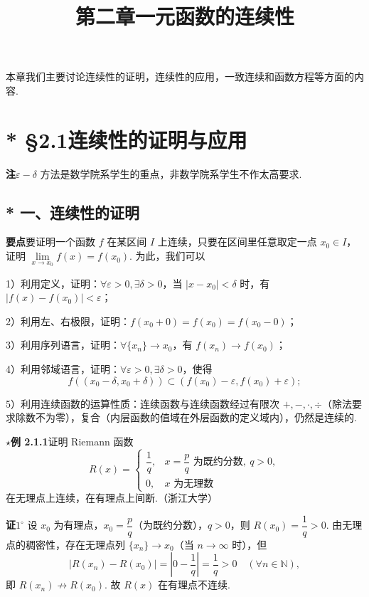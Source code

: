 \documentclass[UTF8,12pt,a4paper,fontset=fandol]{ctexart}
\title{第二章\quad 一元函数的连续性}
\author{}
\date{}
\begin{document}
\maketitle

本章我们主要讨论连续性的证明，连续性的应用，一致连续和函数方程等方面的内容.

\section*{* §2.1\quad 连续性的证明与应用}

\noindent\textbf{注}\quad $\varepsilon-\delta$ 方法是数学院系学生的重点，非数学院系学生不作太高要求.

\subsection*{* 一、连续性的证明}

\noindent\textbf{要点}\quad 要证明一个函数 $f$ 在某区间 $I$ 上连续，只要在区间里任意取定一点 $x_0\in I$，证明 $\lim\limits_{x\to x_0}f(x)=f(x_0)$. 为此，我们可以

1）利用定义，证明：$\forall\varepsilon>0,\exists\delta>0$，当 $|x-x_0|<\delta$ 时，有 $|f(x)-f(x_0)|<\varepsilon$；

2）利用左、右极限，证明：$f(x_0+0)=f(x_0)=f(x_0-0)$；

3）利用序列语言，证明：$\forall\{x_n\}\to x_0$，有 $f(x_n)\to f(x_0)$；

4）利用邻域语言，证明：$\forall\varepsilon>0,\exists\delta>0$，使得
\[
  f((x_0-\delta,x_0+\delta))\subset (f(x_0)-\varepsilon,f(x_0)+\varepsilon);
\]

5）利用连续函数的运算性质：连续函数与连续函数经过有限次 $+,-,\cdot,\div$（除法要求除数不为零），复合（内层函数的值域在外层函数的定义域内），仍然是连续的.

\noindent\textbf{$\star$例 2.1.1}\quad 证明 Riemann 函数
\[
  R(x)=
  \begin{cases}
    \dfrac1q, & x=\dfrac pq\text{ 为既约分数},\ q>0,\\
    0, & x\text{ 为无理数}
  \end{cases}
\]
在无理点上连续，在有理点上间断.（浙江大学）

\noindent\textbf{证}\quad $1^\circ$ 设 $x_0$ 为有理点，$x_0=\dfrac pq$（为既约分数），$q>0$，则 $R(x_0)=\dfrac1q>0$. 由无理点的稠密性，存在无理点列 $\{x_n\}\to x_0$（当 $n\to\infty$ 时），但
\[
  |R(x_n)-R(x_0)|=\left|0-\frac1q\right|=\frac1q>0\quad(\forall n\in\mathbb{N}),
\]
即 $R(x_n)\not\to R(x_0)$. 故 $R(x)$ 在有理点不连续.
\end{document}
